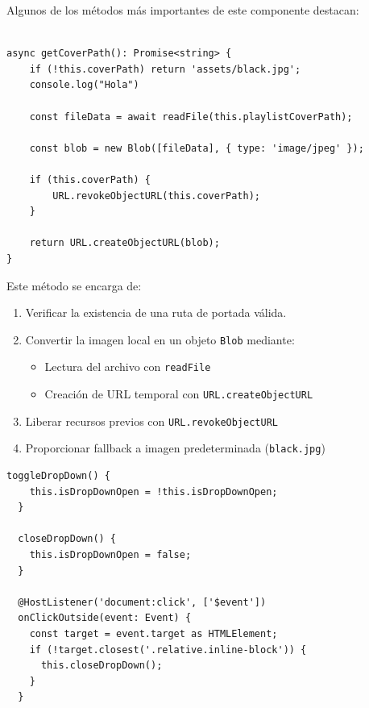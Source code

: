 \documentclass[11pt, a4paper]{article}
\begin{document}
                Algunos de los métodos más importantes de este componente destacan:

                \begin{lstlisting}[caption={getCoverPath()}]

async getCoverPath(): Promise<string> {
    if (!this.coverPath) return 'assets/black.jpg';
    console.log("Hola")

    const fileData = await readFile(this.playlistCoverPath);
        
    const blob = new Blob([fileData], { type: 'image/jpeg' });

    if (this.coverPath) {
        URL.revokeObjectURL(this.coverPath);
    }

    return URL.createObjectURL(blob);
}
                \end{lstlisting}

                Este método se encarga de:
                \begin{enumerate}
                    \item Verificar la existencia de una ruta de portada válida.
                    \item Convertir la imagen local en un objeto \texttt{Blob} mediante:
                    \begin{itemize}
                        \item Lectura del archivo con \texttt{readFile}
                        \item Creación de URL temporal con \texttt{URL.createObjectURL}
                    \end{itemize}
                    \item Liberar recursos previos con \texttt{URL.revokeObjectURL}
                    \item Proporcionar fallback a imagen predeterminada (\texttt{black.jpg})
                \end{enumerate}

                \begin{lstlisting}[caption={Dropdown}]
toggleDropDown() {
    this.isDropDownOpen = !this.isDropDownOpen;
  }

  closeDropDown() {
    this.isDropDownOpen = false;
  }

  @HostListener('document:click', ['$event'])
  onClickOutside(event: Event) {
    const target = event.target as HTMLElement;
    if (!target.closest('.relative.inline-block')) {
      this.closeDropDown();
    }
  }
                \end{lstlisting}
\end{document}
